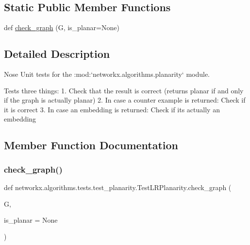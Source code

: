 \subsection*{Static Public Member Functions}
\begin{DoxyCompactItemize}
\item 
def \hyperlink{classnetworkx_1_1algorithms_1_1tests_1_1test__planarity_1_1TestLRPlanarity_adb05fc729e7588e63da825055854cdc5}{check\+\_\+graph} (G, is\+\_\+planar=None)
\end{DoxyCompactItemize}


\subsection{Detailed Description}
\begin{DoxyVerb}Nose Unit tests for the :mod:`networkx.algorithms.planarity` module.

Tests three things:
1. Check that the result is correct
    (returns planar if and only if the graph is actually planar)
2. In case a counter example is returned: Check if it is correct
3. In case an embedding is returned: Check if its actually an embedding
\end{DoxyVerb}
 

\subsection{Member Function Documentation}
\mbox{\label{classnetworkx_1_1algorithms_1_1tests_1_1test__planarity_1_1TestLRPlanarity_adb05fc729e7588e63da825055854cdc5}} 
\subsubsection{\texorpdfstring{check\+\_\+graph()}{check\_graph()}}
{\footnotesize\ttfamily def networkx.\+algorithms.\+tests.\+test\+\_\+planarity.\+Test\+L\+R\+Planarity.\+check\+\_\+graph (\begin{DoxyParamCaption}\item[{}]{G,  }\item[{}]{is\+\_\+planar = {\ttfamily None} }\end{DoxyParamCaption})\hspace{0.3cm}{\ttfamily [static]}}

